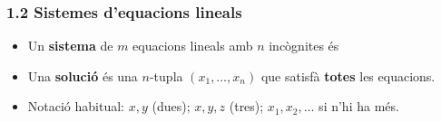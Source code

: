 \documentclass[aspectratio=169]{beamer}
\begin{document}
\begin{frame}[t]
  \frametitle{1.2 Sistemes d'equacions lineals}

  \vspace{-0.2cm}
  \begin{itemize}
    \item<1-> Un \textbf{sistema} de $m$ equacions lineals amb $n$ incògnites és
  \end{itemize}

  \vspace{0.08cm}

  \vspace{0.05cm}
  \begin{itemize}
    \item<2-> Una \textbf{solució} és una $n$-tupla $(x_1,\ldots,x_n)$ que satisfà \textbf{totes} les equacions.
    \item<3-> Notació habitual: $x,y$ (dues); $x,y,z$ (tres); $x_1,x_2,\ldots$ si n'hi ha més.
  \end{itemize}
\end{frame}
\end{document}
